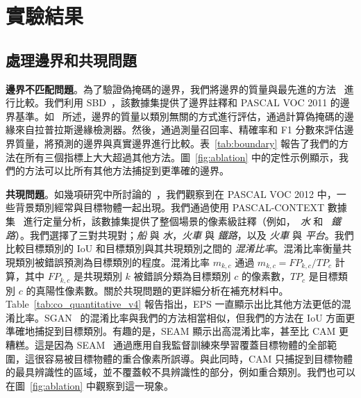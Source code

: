\documentclass[final]{cvpr}
\begin{document}
\section{實驗結果}

\subsection{處理邊界和共現問題}\label{section:5.1}

\noindent\textbf{邊界不匹配問題}。為了驗證偽掩碼的邊界，我們將邊界的質量與最先進的方法~\cite{chen2020boundary, wang2020self, zhou2016learning} 進行比較。我們利用 SBD~\cite{hariharan2011semantic}，該數據集提供了邊界註釋和 PASCAL VOC 2011 的邊界基準。如~\cite{chen2020boundary} 所述，邊界的質量以類別無關的方式進行評估，通過計算偽掩碼的邊緣來自拉普拉斯邊緣檢測器。然後，通過測量召回率、精確率和 F1 分數來評估邊界質量，將預測的邊界與真實邊界進行比較。表~\ref{tab:boundary} 報告了我們的方法在所有三個指標上大大超過其他方法。圖~\ref{fig:ablation} 中的定性示例顯示，我們的方法可以比所有其他方法捕捉到更準確的邊界。




\vspace{1mm}
\noindent \textbf{共現問題}。如幾項研究中所討論的~\cite{huang2018weakly, kolesnikov2016seed, li2018tell, oh2017exploiting}，我們觀察到在 PASCAL VOC 2012 中，一些背景類別經常與目標物體一起出現。我們通過使用 PASCAL-CONTEXT 數據集~\cite{mottaghi2014role} 進行定量分析，該數據集提供了整個場景的像素級註釋（例如，~\emph{水} 和 ~\emph{鐵路}）。我們選擇了三對共現對；\emph{船} 與 \emph{水}，\emph{火車} 與 \emph{鐵路}，以及 \emph{火車} 與 \emph{平台}。我們比較目標類別的 IoU 和目標類別與其共現類別之間的 \emph{混淆比率}。混淆比率衡量共現類別被錯誤預測為目標類別的程度。混淆比率 $m_{k,c}$ 通過 $m_{k,c} = FP_{k,c}/TP_{c}$ 計算，其中 ${FP_{k,c}}$ 是共現類別 $k$ 被錯誤分類為目標類別 $c$ 的像素數，$TP_{c}$ 是目標類別 $c$ 的真陽性像素數。關於共現問題的更詳細分析在補充材料中。
Table~\ref{tab:co_quantitative_v4} 報告指出，EPS 一直顯示出比其他方法更低的混淆比率。SGAN~\cite{yao2020saliency} 的混淆比率與我們的方法相當相似，但我們的方法在 IoU 方面更準確地捕捉到目標類別。有趣的是，SEAM 顯示出高混淆比率，甚至比 CAM 更糟糕。這是因為 SEAM~\cite{wang2020self} 通過應用自我監督訓練來學習覆蓋目標物體的全部範圍，這很容易被目標物體的重合像素所誤導。與此同時，CAM 只捕捉到目標物體的最具辨識性的區域，並不覆蓋較不具辨識性的部分，例如重合類別。我們也可以在圖~\ref{fig:ablation} 中觀察到這一現象。



\end{document}
